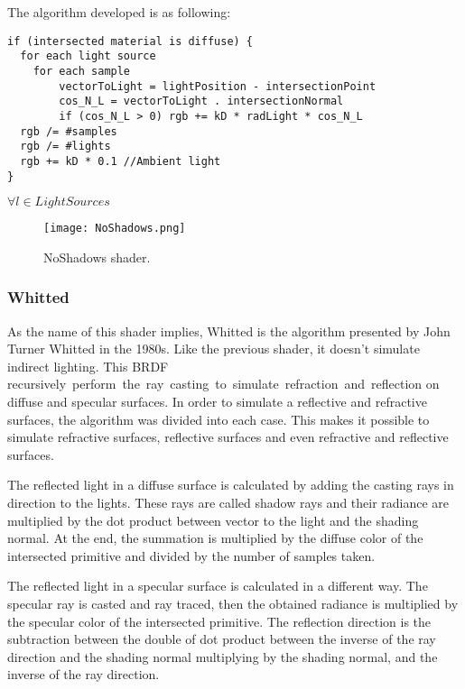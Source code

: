 \par
The algorithm developed is as following:

\begin{lstlisting}[caption={Algorithm of NoShadows Shader}, captionpos=b, label=NoShadows]
if (intersected material is diffuse) {
  for each light source
  	for each sample
	    vectorToLight = lightPosition - intersectionPoint
	    cos_N_L = vectorToLight . intersectionNormal
	    if (cos_N_L > 0) rgb += kD * radLight * cos_N_L
  rgb /= #samples
  rgb /= #lights
  rgb += kD * 0.1 //Ambient light
}
\end{lstlisting}

$\forall l \in LightSources$

\begin{figure}[H]
	\centering
	\caption{NoShadows shader.}
	\label{NoShadows shader.}
	\texttt{[image: NoShadows.png]}
\end{figure}

\subsubsection{Whitted}

\par
As the name of this shader implies, Whitted is the algorithm presented by John Turner Whitted in the 1980s.
Like the previous shader, it doesn't simulate indirect lighting.
This BRDF recursively perform the ray casting to simulate refraction and reflection on diffuse and specular surfaces.
In order to simulate a reflective and refractive surfaces, the algorithm was divided into each case.
This makes it possible to simulate refractive surfaces, reflective surfaces and even refractive and reflective surfaces.

\par
The reflected light in a diffuse surface is calculated by adding the casting rays in direction to the lights.
These rays are called shadow rays and their radiance are multiplied by the dot product between vector to the light and the shading normal.
At the end, the summation is multiplied by the diffuse color of the intersected primitive and divided by the number of samples taken.

\par
The reflected light in a specular surface is calculated in a different way.
The specular ray is casted and ray traced, then the obtained radiance is multiplied by the specular color of the intersected primitive.
The reflection direction is the subtraction between the double of dot product between the inverse of the ray direction and the shading normal multiplying by the shading normal, and the inverse of the ray direction.

